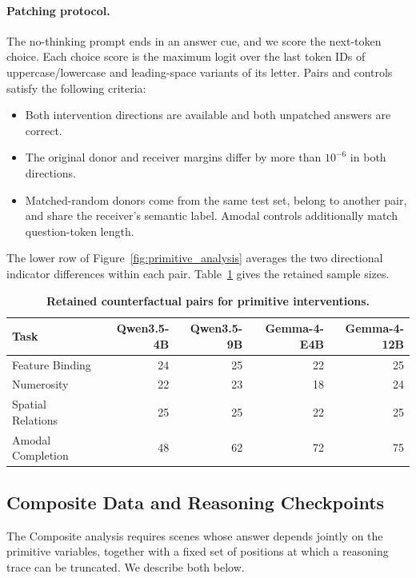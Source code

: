\documentclass{article} %
\begin{document}
\paragraph{Patching protocol.}
The no-thinking prompt ends in an answer cue, and we score the next-token choice. Each choice score is the maximum logit over the last token IDs of uppercase/lowercase and leading-space variants of its letter. Pairs and controls satisfy the following criteria:
\begin{itemize}
\item Both intervention directions are available and both unpatched answers are correct.
\item The original donor and receiver margins differ by more than $10^{-6}$ in both directions.
\item Matched-random donors come from the same test set, belong to another pair, and share the receiver's semantic label. Amodal controls additionally match question-token length.
\end{itemize}
The lower row of Figure~\ref{fig:primitive_analysis} averages the two directional indicator differences within each pair. Table~\ref{tab:patch_retained_pairs} gives the retained sample sizes.

\begin{table}[H]
\centering\small
\renewcommand{\arraystretch}{1.05}
\setlength{\tabcolsep}{4pt}
\caption{\textbf{Retained counterfactual pairs for primitive interventions.}}
\label{tab:patch_retained_pairs}
\begin{tabular*}{\textwidth}{@{\extracolsep{\fill}}lrrrr@{}}
\toprule
Task & Qwen3.5-4B & Qwen3.5-9B & Gemma-4-E4B & Gemma-4-12B \\
\midrule
Feature Binding & 24 & 25 & 22 & 25 \\
Numerosity & 22 & 23 & 18 & 24 \\
Spatial Relations & 25 & 25 & 22 & 25 \\
Amodal Completion & 48 & 62 & 72 & 75 \\
\bottomrule
\end{tabular*}
\end{table}

\subsection{Composite Data and Reasoning Checkpoints}
\label{app:reasoning_checkpoints}

The Composite analysis requires scenes whose answer depends jointly on the primitive variables, together with a fixed set of positions at which a reasoning trace can be truncated. We describe both below.
\end{document}
